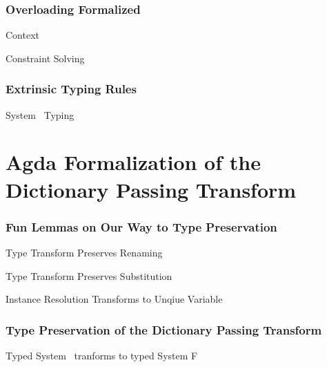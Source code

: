 \documentclass[aspectratio=169]{beamer}
\begin{document}
\begin{frame}[fragile]
  \frametitle{Overloading Formalized}
  \begin{block}{Context}
    \begin{small}
      \FoCtx
    \end{small}
  \end{block}
  \begin{block}{Constraint Solving}
    \begin{small}
      \FoCstrSolve
    \end{small}
  \end{block}
\end{frame}

\begin{frame}[fragile]
  \frametitle{Extrinsic Typing Rules}
  \begin{block}{System \Fo\ Typing}
    \begin{small}
      \FoTyping
    \end{small}
  \end{block}
\end{frame}

\section{Agda Formalization of the Dictionary Passing Transform}
\begin{frame}[fragile]
  \frametitle{Fun Lemmas on Our Way to Type Preservation}
  \begin{block}{Type Transform Preserves Renaming}
    \DPTTypePresRen
  \end{block}
  \begin{block}{Type Transform Preserves Substitution}
    \DPTTypePresSub
  \end{block}
  \begin{block}{Instance Resolution Transforms to Unqiue Variable}
    \DPTOVarPresLookup
  \end{block}
\end{frame}

\begin{frame}[fragile]
  \frametitle{Type Preservation of the Dictionary Passing Transform}
  \begin{block}{Typed System \Fo\ tranforms to typed System F}
    \begin{small}
      \begin{AgdaSuppressSpace}
        \DPTTermPres
      \end{AgdaSuppressSpace}
    \end{small}
  \end{block}
\end{frame}
\end{document}
